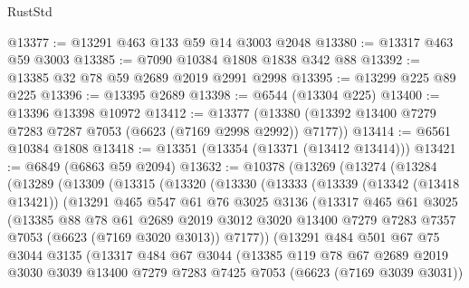 \begin{lexlean}{RustStd}
\begin{coremodule}
@13377 := @13291 @463 @133 @59 @14 @3003 @2048
@13380 := @13317 @463 @59 @3003
@13385 := @7090 @10384 @1808 @1838 @342 @88
@13392 := @13385 @32 @78 @59 @2689 @2019 @2991 @2998
@13395 := @13299 @225 @89 @225
@13396 := @13395 @2689
@13398 := @6544 (@13304 @225)
@13400 := @13396 @13398 @10972
@13412 := @13377 (@13380 (@13392 @13400 @7279 @7283 @7287 @7053 (@6623 (@7169 @2998 @2992)) @7177))
@13414 := @6561 @10384 @1808
@13418 := @13351 (@13354 (@13371 (@13412 @13414)))
@13421 := @6849 (@6863 @59 @2094)
@13632 := @10378
    (@13269
      (@13274
        (@13284
          (@13289
            (@13309
              (@13315
                (@13320
                  (@13330
                    (@13333
                      (@13339
                        (@13342 (@13418 @13421))
                        (@13291
                          @465
                          @547
                          @61
                          @76
                          @3025
                          @3136
                          (@13317
                            @465
                            @61
                            @3025
                            (@13385
                              @88
                              @78
                              @61
                              @2689
                              @2019
                              @3012
                              @3020
                              @13400
                              @7279
                              @7283
                              @7357
                              @7053
                              (@6623 (@7169 @3020 @3013))
                              @7177))
                          (@13291
                            @484
                            @501
                            @67
                            @75
                            @3044
                            @3135
                            (@13317
                              @484
                              @67
                              @3044
                              (@13385
                                @119
                                @78
                                @67
                                @2689
                                @2019
                                @3030
                                @3039
                                @13400
                                @7279
                                @7283
                                @7425
                                @7053
                                (@6623 (@7169 @3039 @3031))

\end{coremodule}
\end{lexlean}
